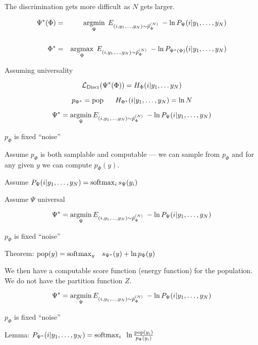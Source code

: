 {\vfill
The discrimination gets more difficult as $N$ gets larger.


\begin{eqnarray*}
\Psi^*(\Phi) & = & \operatorname*{argmin}_\Psi\; E_{(i,y_1,\ldots,y_{N})\sim \tilde{p}_\Phi^{(N)}} \;- \ln P_\Psi(i|y_1,\ldots,y_{N}) \\
\\
\Phi^* & = & \operatorname*{argmax}_\Phi\; E_{(i,y_1,\ldots,y_{N})\sim \tilde{p}_\Phi^{(N)}} \;- \ln P_{\Psi^*(\Phi)}(i|y_1,\ldots,y_{N})
\end{eqnarray*}

\vfill
Assuming universality

\vfill
$${\cal L}_{\mathrm{Discr}}(\Psi^*(\Phi)) = H_\Phi(i|y_1,\ldots y_{N})$$

\vfill
$$p_{\Phi^*} = \mathrm{pop}\;\;\;\;\;\;H_{\Phi^*}(i|y_1,\ldots,y_N) = \ln N$$


{\color{red}
$$\Psi^* = \operatorname*{argmin}_\Psi E_{(i,y_1,\ldots,y_{N}) \sim \tilde{p}_\Phi^{(N)}} \;- \ln P_\Psi(i|y_1,\ldots,y_{N})$$
\centerline{$p_\Phi$ is fixed ``noise''}
}

\vfill
Assume $p_\Phi$ is both samplable and computable --- we can sample from $p_\Phi$ and for any given $y$ we can compute $p_\Phi(y)$.

\vfill
Assume $P_\Psi(i|y_1,\ldots,y_{N}) = \operatorname*{softmax}_i s_\Psi(y_i)$

\vfill
Assume $\Psi$ universal



$$\Psi^* = \operatorname*{argmin}_\Psi E_{(i,y_1,\ldots,y_{N}) \sim \tilde{p}_\Phi^{(N)}} \;- \ln P_\Psi(i|y_1,\ldots,y_{N})$$
\centerline{$p_\Phi$ is fixed ``noise''}

\vfill
Theorem: {\color{red} $\mathrm{pop}(y) = \operatorname*{softmax}_y\;\;\; s_{\Psi^*}(y) + \ln p_\Phi(y)$}

\vfill
We then have a computable score function (energy function) for the population.  We do not have the partition function $Z$.


$$\Psi^* = \operatorname*{argmin}_\Psi E_{(i,y_1,\ldots,y_{N}) \sim \tilde{p}_\Phi^{(N)}} \;- \ln P_\Psi(i|y_1,\ldots,y_{N})$$
\centerline{$p_\Phi$ is fixed ``noise''}

\vfill
Lemma: {\color{red} $P_{\Psi^*}(i|y_1,\ldots,y_{N})  =  \operatorname*{softmax}_i\;\; \ln \frac{\mathrm{pop}(y_i)}{p_\Phi(y_i)}$}

}
